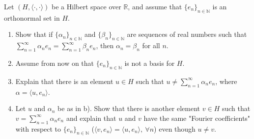 \begin{prob}
    Let $(H, \langle \cdot, \cdot \rangle)$ be a Hilbert space 
    over $\mathbb R$, and assume that $\{e_n\}_{n\in\mathbb N}$ is 
    an orthonormal set in $H$.

    \begin{enumerate}[label=\alph*)]
        \item Show that if $\{\alpha_n\}_{n\in\mathbb N}$ and 
            $\{\beta_n\}_{n\in\mathbb N}$ are sequences of real 
            numbers such that 
            $\sum_{n=1}^\infty \alpha_ne_n = \sum_{n=1}^\infty 
            \beta_ne_n$, then $\alpha_n = \beta_n$ for all 
            $n$.
        \item[] Assume from now on that $\{e_n\}_{n\in\mathbb N}$ is 
            not a basis for $H$.
        \item Explain that there is an element $u \in H$ such that 
            $u \neq \sum_{n=1}^\infty \alpha_ne_n$, where 
            $\alpha = \langle u,e_n\rangle$. 
        \item Let $u$ and $\alpha_n$ be as in b). Show that there 
            is another element $v \in H$ such that 
            $v = \sum_{n=1}^\infty \alpha_ne_n$ and explain that 
            $u$ and $v$ have the same "Fourier coefficients" with 
            respect to $\{e_n\}_{n\in\mathbb N}$ 
            ($\langle v, e_n\rangle = \langle u,e_n\rangle, \ 
            \forall n$) even though $u \neq v$.
    \end{enumerate}
\end{prob}

